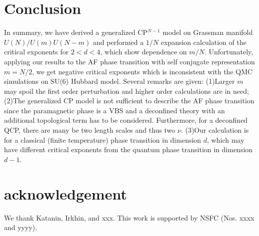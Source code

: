 \documentclass[aps,twocolumn,superscriptaddress]{revtex4-1}
\begin{document}
\section{Conclusion}
In summary, we have derived a generalized CP$^{N-1}$ model on Grassman manifold $U(N)/U(m)U(N-m)$ and performed a $1/N$ expansion calculation of the critical exponents for $2<d<4$, which show dependence on $m/N$. Unfortunately, applying our results to the AF phase transition with self conjugate representation $m=N/2$, we get negative critical exponents which is inconsistent with the QMC simulations on SU(6) Hubbard model. Several remarks are given: (1)Larger $m$ may spoil the first order perturbation and higher order calculations are in need; (2)The generalized CP model is not sufficient to describe the AF phase transition since the paramagnetic phase is a VBS and a deconfined theory with an additional topological term has to be considered. \cite{senthil2004} Furthermore, for a deconfined QCP, there are many be two length scales and thus two $\nu$. \cite{Shao2016} (3)Our calculation is for a classical (finite temperature) phase transition in dimension $d$, which may have different critical exponents from the quantum phase transition in dimension $d-1$. \cite{sondhi1997}


\section{acknowledgement}
We thank Katanin, Irkhin, and xxx. This work is supported by NSFC (Nos. xxxx and yyyy).



\end{document}
